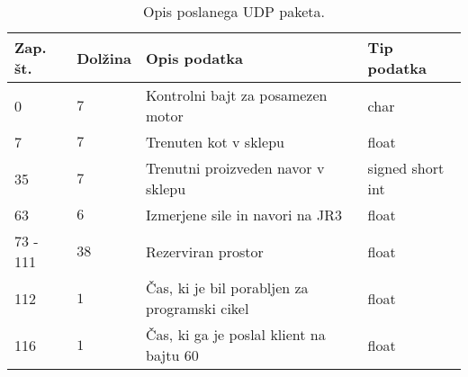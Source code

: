 
\begin{table}[h]
	\centering
	\begin{footnotesize}
		\begin{tabular}{|l l l l |}
		Zap. \v{s}t. &  Dol\v{z}ina& Opis podatka & Tip podatka\\ \hline
		0 & $7$ & Kontrolni bajt za posamezen motor & char \\
		7 & $7$ & Trenuten kot v sklepu & float \\
		35 & $7$ & Trenutni proizveden navor v sklepu & signed short int \\
		63 & $6$ & Izmerjene sile in navori na JR3 & float\\
		73 - 111 & $38$ & Rezerviran prostor & float\\
		112 & $1$ & \v{C}as, ki je bil porabljen za programski cikel & float\\
		116 & $1$ & \v{C}as, ki ga je poslal klient na bajtu 60 & float\\ \hline
		\end{tabular}
	\end{footnotesize}
	\caption{Opis poslanega UDP paketa.}
	\label{table:udp-reply}
\end{table}
